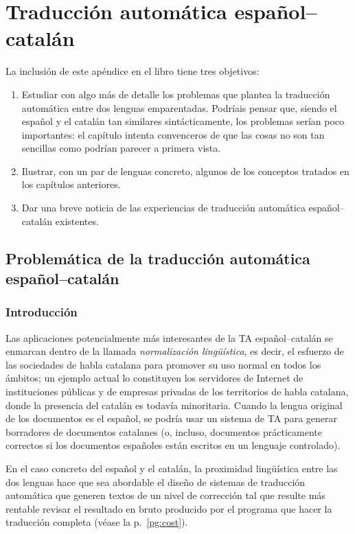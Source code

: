 \chapter{Traducción automática español--catalán} \label{se:PdTACC} 

La inclusión de este apéndice en el libro tiene tres objetivos: \begin{enumerate} \item Estudiar con algo más de detalle los problemas que plantea la traducción automática entre dos lenguas emparentadas. Podríais pensar que, siendo el español y el catalán tan similares sintácticamente, los problemas serían poco importantes: el capítulo intenta convenceros de que las cosas no son tan sencillas como podrían parecer a primera vista. \item Ilustrar, con un par de lenguas concreto, algunos de los conceptos tratados en los capítulos anteriores. \item Dar una breve noticia de las experiencias de traducción automática español--catalán existentes. \end{enumerate} 

\section{Problemática de la traducción automática español--catalán} 

\subsection{Introducción} 

Las aplicaciones potencialmente más interesantes de la TA español--catalán se enmarcan dentro de la llamada {\em normalización lingüística}, es decir, el esfuerzo de las sociedades de habla catalana para promover su uso normal en todos los ámbitos; un ejemplo actual lo constituyen los servidores de Internet de instituciones públicas y de empresas privadas de los territorios de habla catalana, donde la presencia del catalán es todavía minoritaria. Cuando la lengua original de los documentos es el español, se podría usar un sistema de TA para generar borradores de documentos catalanes (o, incluso, documentos prácticamente correctos si los documentos españoles están escritos en un lenguaje controlado). 

En el caso concreto del español y el catalán, la proximidad lingüística entre las dos lenguas hace que sea abordable el diseño de sistemas de traducción automática que generen textos de un nivel de corrección tal que resulte más rentable revisar el resultado en bruto producido por el programa que hacer la traducción completa (véase la p.~\ref{pg:cost}). 

